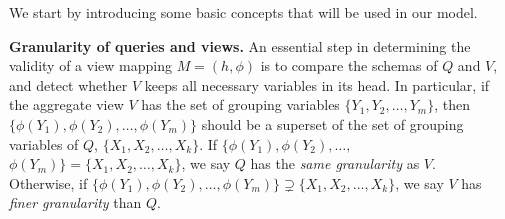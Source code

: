 

We start by introducing some basic concepts that will be used in our model.


\textbf{Granularity of queries and views.} An essential step in determining the validity of a view mapping $M=(h,\phi)$ is to compare the schemas of $Q$ and $V$, and detect whether $V$ keeps all necessary variables in its head. In particular, 
if the aggregate view $V$ has the set of grouping variables $\{Y_1, Y_2,\dots, Y_m\}$, then $\{\phi(Y_1), \phi(Y_2), \dots, \phi(Y_m)\}$ should be a superset of the set of grouping variables of $Q$, $\{X_1, X_2,\dots, X_k\}$. If $\{\phi(Y_1), \phi(Y_2), \dots,$ $\phi(Y_m)\} = \{X_1, X_2,\dots, X_k\}$, we say $Q$ has the {\em same granularity} as $V$. \\ 
Otherwise, if $\{\phi(Y_1), \phi(Y_2), \dots, \phi(Y_m)\} \supsetneq \{X_1, X_2,\dots, X_k\}$, we say $V$ has {\em finer granularity} than $Q$.


